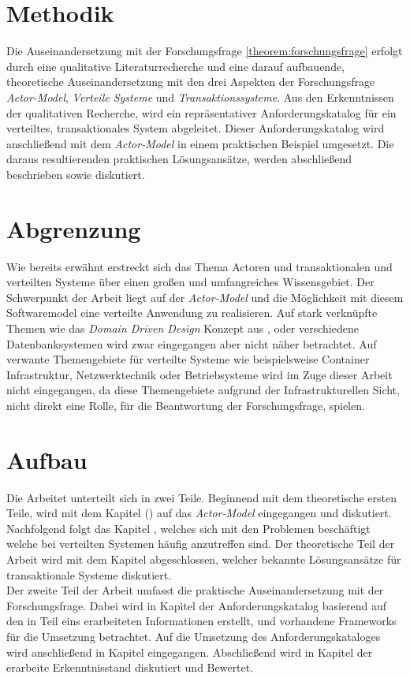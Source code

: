 \section{Methodik}
Die Auseinandersetzung mit der Forschungsfrage \ref{theorem:forschungsfrage} erfolgt durch eine qualitative Literaturrecherche und eine darauf aufbauende, theoretische Auseinandersetzung mit den drei Aspekten der Forschungsfrage \textit{Actor-Model}, \textit{Verteile Systeme} und \textit{Transaktionssysteme}. Aus den Erkenntnissen der qualitativen Recherche, wird ein repräsentativer Anforderungskatalog für ein verteiltes, transaktionales System abgeleitet. Dieser Anforderungskatalog wird anschließend mit dem \textit{Actor-Model} in einem praktischen Beispiel umgesetzt. Die daraus resultierenden praktischen Lösungsansätze, werden abschließend beschrieben sowie diskutiert.
 
\section{Abgrenzung}
Wie bereits erwähnt erstreckt sich das Thema Actoren und transaktionalen und verteilten Systeme über einen großen und umfangreiches Wissensgebiet. Der Schwerpunkt der Arbeit liegt auf der \textit{Actor-Model} und die Möglichkeit mit diesem Softwaremodel eine verteilte Anwendung zu realisieren. Auf stark verknüpfte Themen wie das \textit{Domain Driven Design} Konzept aus \cite{Evans2004Domain-drivenSoftware}, oder verschiedene Datenbanksystemen wird zwar eingegangen aber nicht näher betrachtet. Auf verwante Themengebiete für verteilte Systeme wie beispielsweise Container Infrastruktur, Netzwerktechnik oder Betriebsysteme wird im Zuge dieser Arbeit nicht eingegangen, da diese Themengebiete aufgrund der Infrastrukturellen Sicht, nicht direkt eine Rolle, für die Beantwortung der Forschungsfrage, spielen. 

\section{Aufbau}
Die Arbeitet unterteilt sich in zwei Teile. Beginnend mit dem theoretische ersten Teile, wird mit dem Kapitel  () auf das \textit{Actor-Model} eingegangen und diskutiert. Nachfolgend folgt das Kapitel , welches sich mit den Problemen beschäftigt welche bei verteilten Systemen häufig anzutreffen sind. Der theoretische Teil der Arbeit wird mit dem Kapitel  abgeschlossen, welcher bekannte Lösungsansätze für transaktionale Systeme diskutiert. \\
Der zweite Teil der Arbeit umfasst die praktische Auseinandersetzung mit der Forschungsfrage. Dabei wird in Kapitel  der Anforderungskatalog basierend auf den in Teil eins erarbeiteten Informationen erstellt, und vorhandene Frameworks für die Umsetzung betrachtet. Auf die Umsetzung des Anforderungskataloges wird anschließend in Kapitel  eingegangen. Abschließend wird in Kapitel  der erarbeite Erkenntnisstand diskutiert und Bewertet.  